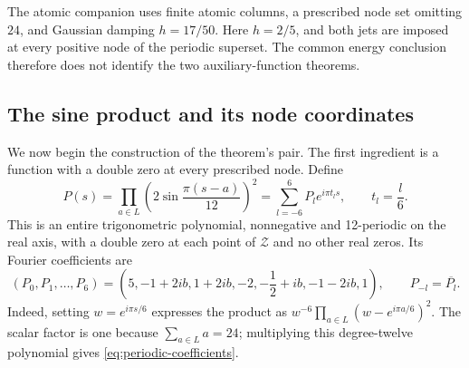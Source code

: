 The atomic companion \citep[Sections~3--4]{AtomicTriangular2026} uses finite
atomic columns, a prescribed node set omitting $24$, and Gaussian damping
$h=17/50$.  Here $h=2/5$, and both jets are imposed at every positive node
of the periodic superset.  The common energy conclusion therefore does not
identify the two auxiliary-function theorems.

\subsection{The sine product and its node coordinates}

We now begin the construction of the theorem's pair.  The first ingredient
is a function with a double zero at every prescribed node.  Define
\begin{equation}\label{eq:periodic-polynomial}
 P(s)=\prod_{a\in L}\left(2\sin\frac{\pi(s-a)}{12}\right)^2
     =\sum_{l=-6}^{6}P_l e^{i\pi t_l s},\qquad t_l=\frac l6.
\end{equation}
This is an entire trigonometric polynomial, nonnegative and 12-periodic on the
real axis, with a double zero at each point of \(\mathcal Z\) and no other real
zeros.  Its Fourier coefficients are
\begin{equation}\label{eq:periodic-coefficients}
 (P_0,P_1,\ldots,P_6)
 =\left(5,-1+2ib,1+2ib,-2,-\frac12+ib,-1-2ib,1\right),
 \qquad P_{-l}=\overline{P_l}.
\end{equation}
Indeed, setting \(w=e^{i\pi s/6}\) expresses the product as
\(w^{-6}\prod_{a\in L}(w-e^{i\pi a/6})^2\).  The scalar factor is one because
\(\sum_{a\in L}a=24\); multiplying this degree-twelve polynomial gives
\eqref{eq:periodic-coefficients}.

